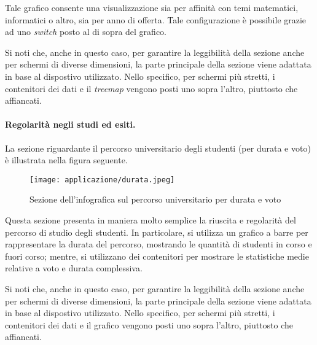 Tale grafico consente una visualizzazione sia per affinità con temi matematici, informatici o altro, sia per anno di offerta.
Tale configurazione è possibile grazie ad uno \emph{switch} posto al di sopra del grafico.

\bigskip
\noindent Si noti che, anche in questo caso, per garantire la leggibilità della sezione anche per schermi di diverse dimensioni, la parte principale della sezione viene adattata 
in base al dispostivo utilizzato. Nello specifico, per schermi più stretti, i contenitori dei dati e il \emph{treemap} vengono posti uno sopra l'altro, piuttosto che affiancati.

\paragraph{Regolarità negli studi ed esiti.} La sezione riguardante il percorso universitario degli studenti (per durata e voto) è illustrata nella figura seguente. 
\begin{figure}[H] 
    \centering 
    \texttt{[image: applicazione/durata.jpeg]} 
    \caption{Sezione dell'infografica sul percorso universitario per durata e voto}
    \label{fig:app_durata}
\end{figure}
\noindent Questa sezione presenta in maniera molto semplice la riuscita e regolarità del percorso di studio degli studenti. In particolare, si utilizza un grafico a barre 
per rappresentare la durata del percorso, mostrando le quantità di studenti in corso e fuori corso; mentre, si utilizzano dei contenitori per mostrare le statistiche medie relative 
a voto e durata complessiva.

\bigskip
\noindent Si noti che, anche in questo caso, per garantire la leggibilità della sezione anche per schermi di diverse dimensioni, la parte principale della sezione viene adattata 
in base al dispostivo utilizzato. Nello specifico, per schermi più stretti, i contenitori dei dati e il grafico vengono posti uno sopra l'altro, piuttosto che affiancati.

